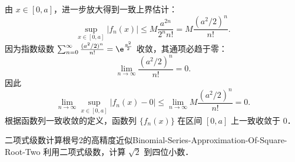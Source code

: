 \begin{myproof}
    由 $x \in [0, a]$，进一步放大得到一致上界估计：
    \begin{equation}
        \sup_{x \in [0, a]} |f_n(x)| \leqslant M \frac{a^{2n}}{2^n n!} = M \frac{(a^2/2)^n}{n!}.
    \end{equation}
    因为指数级数 $\sum_{n=0}^\infty \frac{(a^2/2)^n}{n!} = \e^{\frac{a^2}{2}}$ 收敛，其通项必趋于零：
    \begin{equation}
        \lim_{n\to\infty} \frac{(a^2/2)^n}{n!} = 0.
    \end{equation}
    因此
    \begin{equation}
        \lim_{n\to\infty} \sup_{x \in [0, a]} |f_n(x) - 0| \leqslant \lim_{n\to\infty} M \frac{(a^2/2)^n}{n!} = 0.
    \end{equation}
    根据函数列一致收敛的定义，函数列 $\{f_n(x)\}$ 在区间 $[0, a]$ 上一致收敛于 $0$．
\end{myproof}

\begin{problem}{二项式级数计算根号2的高精度近似}{Binomial-Series-Approximation-Of-Square-Root-Two}
    利用二项式级数，计算 $\sqrt{2}$ 到四位小数．
\end{problem}

